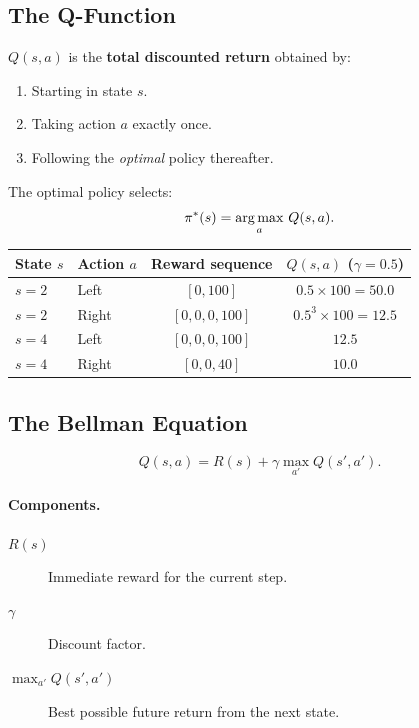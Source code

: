 \subsection{The Q-Function}

\begin{definition}
$Q(s,a)$ is the \textbf{total discounted return} obtained by:
\begin{enumerate}
\item Starting in state $s$.
\item Taking action $a$ exactly once.
\item Following the \emph{optimal} policy thereafter.
\end{enumerate}
\end{definition}

The optimal policy selects:
\begin{equation}
\pi^*(s)=\operatorname*{arg\,max}_a\,Q(s,a).
\label{eq:greedy}
\end{equation}

\begin{center}
\begin{tabular}{llcc}
\toprule
State $s$ & Action $a$ & Reward sequence & $Q(s,a)$ ($\gamma=0.5$)\\
\midrule
$s=2$ & Left  & $[0,100]$  & $0.5\times 100=50.0$\\
$s=2$ & Right & $[0,0,0,100]$ & $0.5^3\times 100=12.5$\\
$s=4$ & Left  & $[0,0,0,100]$ & $12.5$\\
$s=4$ & Right & $[0,0,40]$    & $10.0$\\
\bottomrule
\end{tabular}
\end{center}

\subsection{The Bellman Equation}

\begin{equation}
\boxed{Q(s,a)=R(s)+\gamma\max_{a'}Q(s',a').}
\label{eq:bellman}
\end{equation}

\paragraph{Components.}
\begin{description}
\item[$R(s)$] Immediate reward for the current step.
\item[$\gamma$] Discount factor.
\item[$\max_{a'}Q(s',a')$] Best possible future return from the next state.
\end{description}

